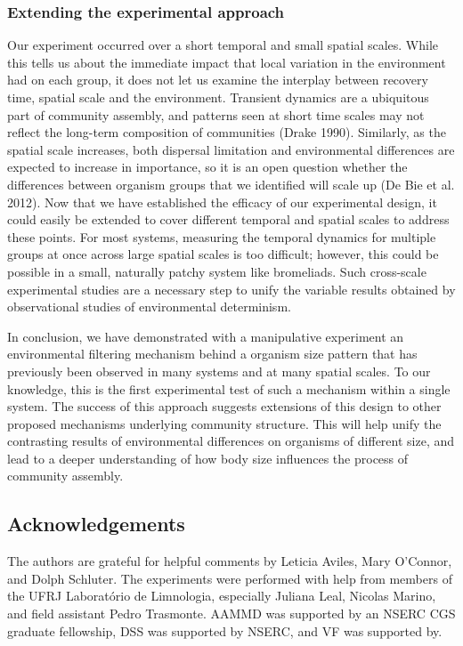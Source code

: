 \documentclass[12pt,]{article}
\begin{document}
\subsubsection{Extending the experimental
approach}\label{extending-the-experimental-approach}

Our experiment occurred over a short temporal and small spatial scales.
While this tells us about the immediate impact that local variation in
the environment had on each group, it does not let us examine the
interplay between recovery time, spatial scale and the environment.
Transient dynamics are a ubiquitous part of community assembly, and
patterns seen at short time scales may not reflect the long-term
composition of communities (Drake 1990). Similarly, as the spatial scale
increases, both dispersal limitation and environmental differences are
expected to increase in importance, so it is an open question whether
the differences between organism groups that we identified will scale up
(De Bie et al. 2012). Now that we have established the efficacy of our
experimental design, it could easily be extended to cover different
temporal and spatial scales to address these points. For most systems,
measuring the temporal dynamics for multiple groups at once across large
spatial scales is too difficult; however, this could be possible in a
small, naturally patchy system like bromeliads. Such cross-scale
experimental studies are a necessary step to unify the variable results
obtained by observational studies of environmental determinism.

In conclusion, we have demonstrated with a manipulative experiment an
environmental filtering mechanism behind a organism size pattern that
has previously been observed in many systems and at many spatial scales.
To our knowledge, this is the first experimental test of such a
mechanism within a single system. The success of this approach suggests
extensions of this design to other proposed mechanisms underlying
community structure. This will help unify the contrasting results of
environmental differences on organisms of different size, and lead to a
deeper understanding of how body size influences the process of
community assembly.

\subsection{Acknowledgements}\label{acknowledgements}

The authors are grateful for helpful comments by Leticia Aviles, Mary
O'Connor, and Dolph Schluter. The experiments were performed with help
from members of the UFRJ Laboratório de Limnologia, especially Juliana
Leal, Nicolas Marino, and field assistant Pedro Trasmonte. AAMMD was
supported by an NSERC CGS graduate fellowship, DSS was supported by
NSERC, and VF was supported by.
\end{document}

